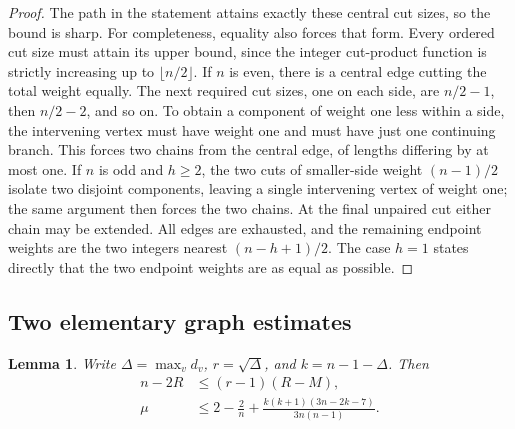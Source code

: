 \documentclass[11pt,a4paper]{article}
\newtheorem{lemma}[theorem]{Lemma}
\theoremstyle{definition}
\theoremstyle{remark}
\numberwithin{equation}{section}
\begin{document}
\begin{proof}
The path in the statement attains exactly these central cut sizes, so the
bound is sharp. For completeness, equality also forces that form. Every
ordered cut size must attain its upper bound, since the integer cut-product
function is strictly increasing up to $\lfloor n/2\rfloor$. If $n$ is even,
there is a central edge cutting the total weight equally. The next required
cut sizes, one on each side, are $n/2-1$, then $n/2-2$, and so on. To obtain
a component of weight one less within a side, the intervening vertex must
have weight one and must have just one continuing branch. This forces two
chains from the central edge, of lengths differing by at most one. If $n$
is odd and $h\ge2$, the two cuts of smaller-side weight $(n-1)/2$ isolate
two disjoint components, leaving a single intervening vertex of weight one;
the same argument then forces the two chains. At the final unpaired cut
either chain may be extended. All edges are exhausted, and the remaining
endpoint weights are the two integers nearest $(n-h+1)/2$. The case $h=1$
states directly that the two endpoint weights are as equal as possible.
\end{proof}

\subsection{Two elementary graph estimates}

\begin{lemma}\label{lem:ch-bridge-and-broom}
Write $\Delta=\max_vd_v$, $r=\sqrt\Delta$, and $k=n-1-\Delta$.
Then
\begin{align}
 n-2R&\le(r-1)(R-M),\label{eq:ch-edge-bridge}\\
 \mu&\le 2-\frac2n+
 \frac{k(k+1)(3n-2k-7)}{3n(n-1)}.\label{eq:ch-broom-sharp}
\end{align}
\end{lemma}
\end{document}
